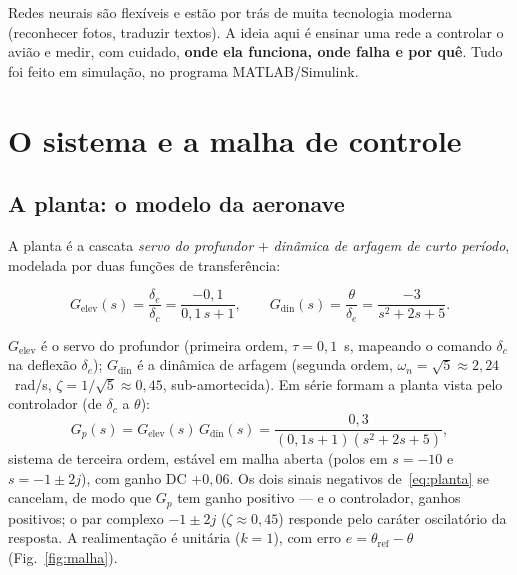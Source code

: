 \documentclass[11pt,a4paper]{article}
\newcommand{\thetaref}{\theta_{\mathrm{ref}}}
\begin{document}
Redes neurais são flexíveis e estão por trás de muita tecnologia moderna (reconhecer
fotos, traduzir textos). A ideia aqui é ensinar uma rede a controlar o avião e medir,
com cuidado, \textbf{onde ela funciona, onde falha e por quê}. Tudo foi feito em
simulação, no programa MATLAB/Simulink.

\section{O sistema e a malha de controle}

\subsection{A planta: o modelo da aeronave}

A planta é a cascata \emph{servo do profundor} $+$ \emph{dinâmica de arfagem de curto
período}, modelada por duas funções de transferência:

\begin{equation}
  G_{\mathrm{elev}}(s)=\frac{\delta_e}{\delta_c}=\frac{-0{,}1}{0{,}1\,s+1},
  \qquad
  G_{\mathrm{din}}(s)=\frac{\theta}{\delta_e}=\frac{-3}{s^2+2s+5}.
  \label{eq:planta}
\end{equation}

$G_{\mathrm{elev}}$ é o servo do profundor (primeira ordem, $\tau=0{,}1$~s, mapeando o
comando $\delta_c$ na deflexão $\delta_e$); $G_{\mathrm{din}}$ é a dinâmica de arfagem
(segunda ordem, $\omega_n=\sqrt{5}\approx2{,}24$~rad/s, $\zeta=1/\sqrt{5}\approx0{,}45$,
sub-amortecida). Em série formam a planta vista pelo controlador (de $\delta_c$ a
$\theta$):
\begin{equation}
  G_p(s)=G_{\mathrm{elev}}(s)\,G_{\mathrm{din}}(s)
        =\frac{0{,}3}{(0{,}1s+1)(s^2+2s+5)},
  \label{eq:gp}
\end{equation}
sistema de terceira ordem, estável em malha aberta (polos em $s=-10$ e $s=-1\pm2j$),
com ganho DC $+0{,}06$. Os dois sinais negativos de~\eqref{eq:planta} se cancelam, de
modo que $G_p$ tem ganho positivo --- e o controlador, ganhos positivos; o par complexo
$-1\pm2j$ ($\zeta\approx0{,}45$) responde pelo caráter oscilatório da resposta. A
realimentação é unitária ($k=1$), com erro $e=\thetaref-\theta$ (Fig.~\ref{fig:malha}).
\end{document}
